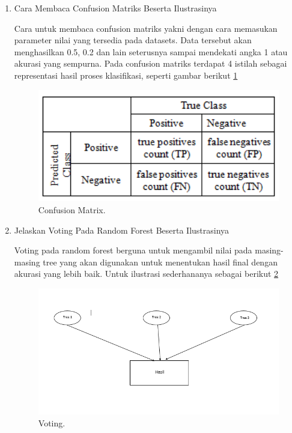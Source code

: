 \begin{enumerate}
\item Cara Membaca Confusion Matriks Beserta Ilustrasinya \par
Cara untuk membaca confusion matriks yakni dengan cara memasukan parameter nilai yang tersedia pada datasets. Data tersebut akan  menghasilkan 0.5, 0.2 dan lain seterusnya sampai mendekati angka 1 atau akurasi yang sempurna. Pada confusion matriks terdapat 4 istilah sebagai representasi hasil proses klasifikasi, seperti gambar berikut \ref{R2}
		\begin{figure}[ht]
		\centerline{\includegraphics[width=1\textwidth]{figures/im/R2.png}}
		\caption{Confusion Matrix.}
		\label{R2}
		\end{figure}

\item Jelaskan Voting Pada Random Forest Beserta Ilustrasinya \par
Voting pada random forest berguna untuk mengambil nilai pada masing-masing tree yang akan digunakan untuk menentukan hasil final dengan akurasi yang lebih baik. Untuk ilustrasi sederhananya sebagai berikut \ref{R3}
		\begin{figure}[ht]
		\centerline{\includegraphics[width=1\textwidth]{figures/im/R3.png}}
		\caption{Voting.}
		\label{R3}
		\end{figure}
\end{enumerate}

